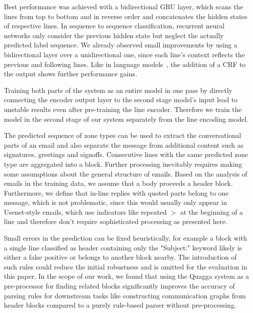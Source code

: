 \documentclass{llncs}
\begin{document}
Best performance was achieved with a bidirectional GRU layer, which scans the lines from top to bottom and in reverse order and concatenates the hidden states of respective lines.
In sequence to sequence classification, recurrent neural networks only consider the previous hidden state but neglect the actually predicted label sequence.
We already observed small improvements by using a bidirectional layer over a unidirectional one, since each line's context reflects the previous and following lines.
Like in language models~\cite{lstm_crf,lstm_cnn_crf}, the addition of a CRF to the output shows further performance gains.

Training both parts of the system as an entire model in one pass by directly connecting the encoder output layer to the second stage model's input lead to unstable results even after pre-training the line encoder.
Therefore we train the model in the second stage of our system separately from the line encoding model.

The predicted sequence of zone types can be used to extract the conversational parts of an email and also separate the message from additional content such as signatures, greetings and signoffs.
Consecutive lines with the same predicted zone type are aggregated into a block.
Further processing inevitably requires making some assumptions about the general structure of emails.
Based on the analysis of emails in the training data, we assume that a body proceeds a header block.
Furthermore, we define that in-line replies with quoted parts belong to one message, which is not problematic, since this would usually only appear in Usenet-style emails, which use indicators like repeated $>$ at the beginning of a line and therefore don't require sophisticated processing as presented here.

Small errors in the prediction can be fixed heuristically, for example a block with a single line classified as header containing only the "Subject:" keyword likely is either a false positive or belongs to another block nearby.
The introduction of such rules could reduce the initial robustness and is omitted for the evaluation in this paper.
In the scope of our work, we found that using the Quagga system as a pre-processor for finding related blocks significantly improves the accuracy of parsing rules for downstream tasks like constructing communication graphs from header blocks compared to a purely rule-based parser without pre-processing.

\end{document}
